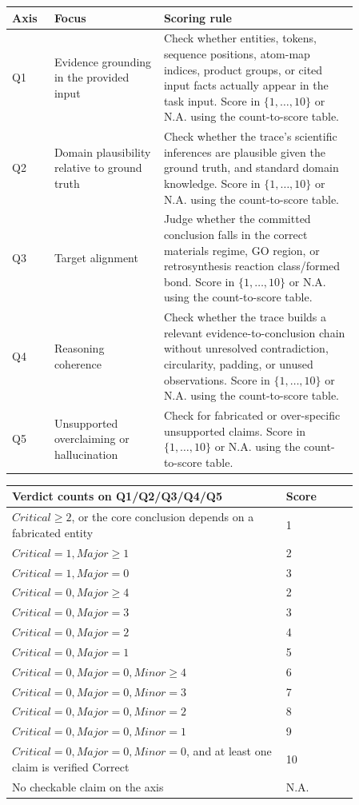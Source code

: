 \begin{appendices}
\begin{longtable}{P{0.10\linewidth}P{0.275\linewidth}P{0.48\linewidth}}
\toprule
\textbf{Axis} & \textbf{Focus} & \textbf{Scoring rule} \\
\midrule
Q1 & Evidence grounding in the provided input & Check whether entities, tokens, sequence positions, atom-map indices, product groups, or cited input facts actually appear in the task input. Score in \(\{1,\ldots,10\}\) or N.A. using the count-to-score table. \\
Q2 & Domain plausibility relative to ground truth & Check whether the trace's scientific inferences are plausible given the ground truth, and standard domain knowledge. Score in \(\{1,\ldots,10\}\) or N.A. using the count-to-score table. \\
Q3 & Target alignment & Judge whether the committed conclusion falls in the correct materials regime, GO region, or retrosynthesis reaction class/formed bond. Score in \(\{1,\ldots,10\}\) or N.A. using the count-to-score table. \\
Q4 & Reasoning coherence & Check whether the trace builds a relevant evidence-to-conclusion chain without unresolved contradiction, circularity, padding, or unused observations. Score in \(\{1,\ldots,10\}\) or N.A. using the count-to-score table. \\
Q5 & Unsupported overclaiming or hallucination & Check for fabricated or over-specific unsupported claims. Score in \(\{1,\ldots,10\}\) or N.A. using the count-to-score table. \\
\bottomrule
\end{longtable}

\begin{longtable}{P{0.68\linewidth}P{0.18\linewidth}}
\toprule
\textbf{Verdict counts on Q1/Q2/Q3/Q4/Q5} & \textbf{Score} \\
\midrule
\(Critical \ge 2\), or the core conclusion depends on a fabricated entity & 1 \\
\(Critical=1, Major\ge 1\) & 2 \\
\(Critical=1, Major=0\) & 3 \\
\(Critical=0, Major\ge 4\) & 2 \\
\(Critical=0, Major=3\) & 3 \\
\(Critical=0, Major=2\) & 4 \\
\(Critical=0, Major=1\) & 5 \\
\(Critical=0, Major=0, Minor\ge 4\) & 6 \\
\(Critical=0, Major=0, Minor=3\) & 7 \\
\(Critical=0, Major=0, Minor=2\) & 8 \\
\(Critical=0, Major=0, Minor=1\) & 9 \\
\(Critical=0, Major=0, Minor=0\), and at least one claim is verified Correct & 10 \\
No checkable claim on the axis & N.A. \\
\bottomrule
\end{longtable}


\end{appendices}
